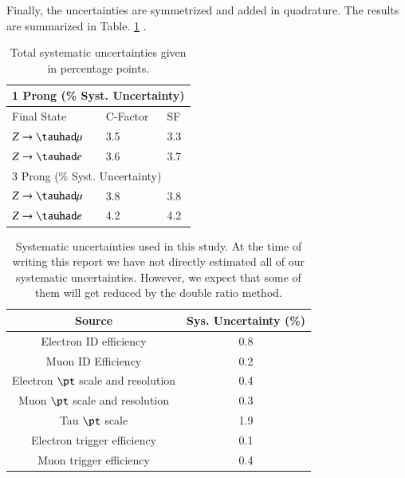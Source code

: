 Finally, the uncertainties are symmetrized and added in quadrature. The results are summarized in Table. \ref{totalsys} .
\begin{table}[]
	\centering
	\begin{tabular}{|lll|}
		\hline
		\multicolumn{3}{|l|}{1 Prong (\% Syst. Uncertainty)}                         \\ \hline
		\multicolumn{1}{|l|}{Final State}      & \multicolumn{1}{l|}{C-Factor} & SF  \\ \hline
		\multicolumn{1}{|l|}{$Z\to\tauhad\mu$} & \multicolumn{1}{l|}{3.5}      & 3.3 \\ \hline
		\multicolumn{1}{|l|}{$Z\to\tauhad e$}  & \multicolumn{1}{l|}{3.6}      & 3.7 \\ \hline
		\multicolumn{3}{|l|}{3 Prong (\% Syst. Uncertainty)}                         \\ \hline
		\multicolumn{1}{|l|}{$Z\to\tauhad\mu$} & \multicolumn{1}{l|}{3.8}      & 3.8 \\ \hline
		\multicolumn{1}{|l|}{$Z\to\tauhad e$}  & \multicolumn{1}{l|}{4.2}      & 4.2 \\ \hline
	\end{tabular}
	\caption{Total systematic uncertainties given in percentage points.}
	\label{totalsys}
\end{table}


\begin{table}[htbp]
	\centering
	\begin{tabular}{cc}
		\hline
		\multicolumn{1}{|c|}{Source}        & \multicolumn{1}{c|}{Sys. Uncertainty (\%)} \\ \hline
		Electron ID efficiency              & 0.8                                        \\
		Muon ID Efficiency                  & 0.2                                        \\
		Electron $\pt$ scale and resolution & 0.4                                        \\
		Muon $\pt$ scale and resolution     & 0.3                                        \\
		Tau $\pt$ scale                     & 1.9                                        \\
		Electron trigger efficiency         & 0.1                                        \\
		Muon trigger efficiency             & 0.4                                        \\ 
	\end{tabular}
	\caption{Systematic uncertainties used in this study. At the time of writing this report we have not directly estimated all of our systematic uncertainties. However, we expect that some of them will get reduced by the double ratio method.}
	\label{Tab5}
\end{table}

